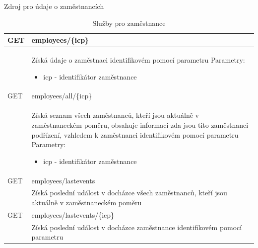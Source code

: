 \documentclass{diplomka}
\begin{document}
\noindent
Zdroj pro údaje o zaměstnancích
\begin{table}[H]
\begin{center}
\begin{tabular}{| m{2cm} |  m{10cm} |}
\hline
\rowcolor{Gray}
GET  & employees/\{icp\} \\ \hline
&  \parbox{10cm}{Získá údaje o zaměstnaci identifikovém pomocí parametru\\
Parametry:\begin{itemize}[noitemsep,nolistsep]
\item icp - identifikátor zaměstnance
\end{itemize}} \\ \hline
\hline
{}
GET  & employees/all/\{icp\} \\ \hline
&  \parbox{10cm}{Získá seznam všech zaměstnanců, kteří jsou aktuálně v zaměstnaneckém poměru, obsahuje informaci zda jsou tito zaměstnanci podřízení, vzhledem k zaměstnanci identifikovém pomocí parametru\\
Parametry:\begin{itemize}[noitemsep,nolistsep]
\item icp - identifikátor zaměstnance
\end{itemize}} \\ \hline
{}
GET  & employees/lastevents \\ 
&  \parbox{10cm}{Získá poslední událost v docházce všech zaměstnanců, kteří jsou aktuálně v zaměstnaneckém poměru}\\
\hline
{}
GET  & employees/lastevents/\{icp\} \\ 
&  \parbox{10cm}{Získá poslední událost v docházce zaměstnance identifikovém pomocí parametru}\\
\hline
\end{tabular}
\end{center}
\caption{Služby pro zaměstnance}
\label{tab:uriemps}
\end{table}
\noindent
\end{document}
